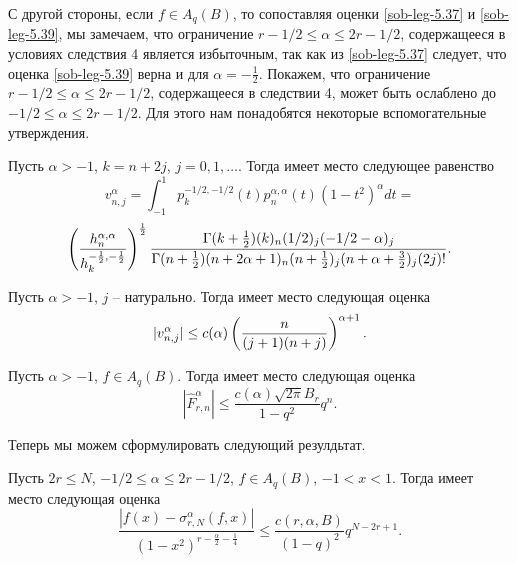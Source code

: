 С другой стороны, если  $f\in A_q(B)$, то сопоставляя оценки \eqref{sob-leg-5.37} и \eqref{sob-leg-5.39}, мы замечаем, что ограничение $r-1/2\le \alpha\le 2r-1/2$, содержащееся в условиях следствия 4 является избыточным, так как из \eqref{sob-leg-5.37} следует, что оценка \eqref{sob-leg-5.39} верна и для $\alpha=-\frac12$. Покажем, что ограничение $r-1/2\le \alpha\le 2r-1/2$, содержащееся  в следствии 4, может быть ослаблено до $-1/2\le \alpha\le 2r-1/2$. Для этого нам понадобятся некоторые вспомогательные утверждения.

\begin{lemma} Пусть $\alpha>-1$, $k=n+2j$, $j=0,1,\ldots$. Тогда имеет место следующее равенство
$$
v_{n,j}^\alpha=\int_{-1}^1p_k^{-1/2,-1/2}(t)p_n^{\alpha,\alpha}(t)(1-t^2)^\alpha dt=
$$
\begin{equation}\label{sob-leg-5.40}
\left(\frac{h_n^{\alpha,\alpha}}{h_k^{-\frac12,-\frac12}}\right)^\frac12
 {\Gamma(k+\frac12)(k)_n(1/2)_j(-1/2-\alpha)_j\over\Gamma(n+\frac12)(n+2\alpha+1)_n
(n+\frac12)_j(n+\alpha+\frac32)_j(2j)!}.
  \end{equation}
\end{lemma}
\begin{lemma} Пусть $\alpha>-1$, $j$ -- натурально. Тогда имеет место следующая оценка
$$
|v_{n,j}^\alpha|\le c(\alpha)\left({n\over (j+1)(n+j)}\right)^{\alpha+1}.$$
\end{lemma}

\begin{lemma} Пусть $\alpha>-1$, $f\in A_q(B)$. Тогда имеет место следующая оценка
 \begin{equation}\label{sob-leg-5.44}
|\hat F^\alpha_{r,n}|\le \frac{c(\alpha)\sqrt{2\pi}B_r}{1-q^2}q^n.
 \end{equation}
\end{lemma}
Теперь мы можем сформулировать следующий резулдьтат.
\begin{theorem} Пусть $2r\le N$, $-1/2\le \alpha\le 2r-1/2$, $f\in A_q(B)$, $-1<x<1$. Тогда имеет место следующая оценка
\begin{equation}\label{sob-leg-5.46}
 \frac{|f(x)-\sigma_{r,N}^\alpha(f,x)|}
{(1-x^2)^{r-\frac{\alpha}{2}-\frac14}}\le\frac{c(r,\alpha, B)}{(1-q)^2}q^{N-2r+1}.
 \end{equation}
\end{theorem} 